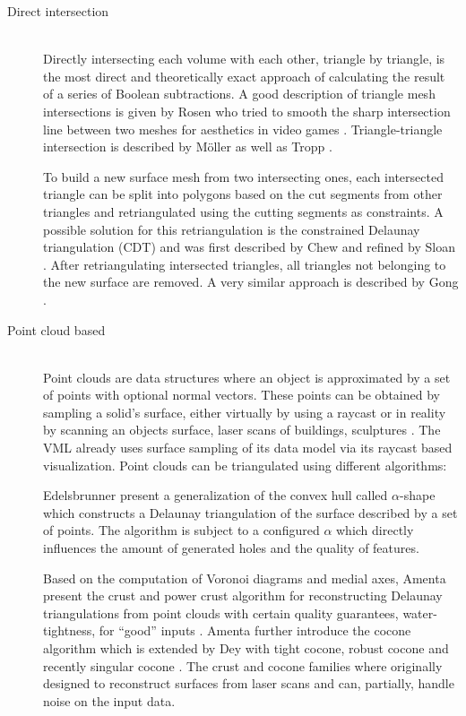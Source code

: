 \begin{description}
	\item[Direct intersection] \hfill \\
	Directly intersecting each volume with each other, triangle by triangle, is the most direct and theoretically exact approach of calculating the result of a series of Boolean subtractions.
	A good description of triangle mesh intersections is given by Rosen who tried to smooth the sharp intersection line between two meshes for aesthetics in video games \cite{mesh_intersection}.
	Triangle-triangle intersection is described by Möller \cite{tri_tri_intersection_moller} as well as Tropp \etal \cite{tri_tri_intersection_2}.

	To build a new surface mesh from two intersecting ones, each intersected triangle can be split into polygons based on the cut segments from other triangles and retriangulated using the cutting segments as constraints.
	A possible solution for this retriangulation is the constrained Delaunay triangulation (CDT) and was first described by Chew \cite{cdt} and refined by Sloan \cite{cdt_fast}.
	After retriangulating intersected triangles, all triangles not belonging to the new surface are removed.
	A very similar approach is described by Gong \cite{cutter_workpiece_engagement}.


	\item[Point cloud based] \hfill \\
	Point clouds are data structures where an object is approximated by a set of points with optional normal vectors.
	These points can be obtained \eg by sampling a solid's surface, either virtually by \eg using a raycast or in reality by scanning an objects surface, \eg laser scans of buildings, sculptures \etc.
	The VML already uses surface sampling of its data model via its raycast based visualization.
	Point clouds can be triangulated using different algorithms:

	Edelsbrunner \etal present a generalization of the convex hull called $\alpha$-shape \cite{alpha_shape} which constructs a Delaunay triangulation of the surface described by a set of points.
	The algorithm is subject to a configured $\alpha$ which directly influences the amount of generated holes and the quality of features.

	Based on the computation of Voronoi diagrams and medial axes, Amenta \etal present the crust and power crust algorithm for reconstructing Delaunay triangulations from point clouds with certain quality guarantees, \eg water-tightness, for \enquote{good} inputs \cite{crust, power_crust}.
	Amenta \etal further introduce the cocone algorithm \cite{cocone} which is extended by Dey \etal with tight cocone, robust cocone and recently singular cocone \cite{tight_cocone, robust_cocone, singular_cocone}.
	The crust and cocone families where originally designed to reconstruct surfaces from laser scans and can, partially, handle noise on the input data.


\end{description}

